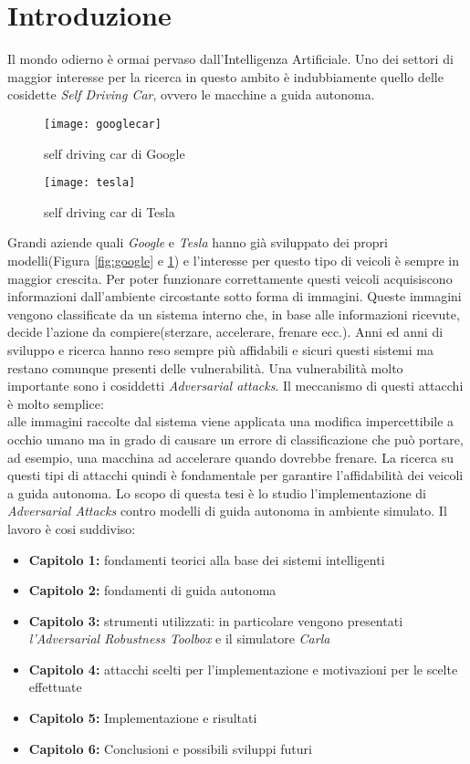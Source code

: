 \chapter*{Introduzione}
Il mondo odierno è ormai pervaso dall'Intelligenza Artificiale. Uno dei settori di maggior interesse per la
ricerca in questo ambito è indubbiamente quello delle cosidette \emph{Self Driving Car}, ovvero
le macchine a guida autonoma. 
\begin{figure}
  \centering
  \parbox{5cm}{
  \texttt{[image: googlecar]}
  \caption{self driving car di Google}
  \label{fig:google}}
  \qquad
  \begin{minipage}{5cm}
  \texttt{[image: tesla]}
  \caption{self driving car di Tesla}
  \label{fig:tesla}
  \end{minipage}
  \end{figure}
Grandi aziende quali \emph{Google} e \emph{Tesla} hanno già sviluppato
dei propri modelli(Figura \ref{fig:google} e \ref{fig:tesla}) e l'interesse per questo tipo di veicoli è sempre in  maggior crescita.
Per poter funzionare correttamente questi veicoli acquisiscono informazioni dall'ambiente circostante sotto forma di immagini.
Queste immagini vengono classificate da un sistema interno che, in base alle informazioni ricevute, decide l'azione da compiere(sterzare, accelerare, frenare ecc.).
Anni ed anni di sviluppo e ricerca hanno reso sempre più affidabili e sicuri  questi sistemi ma restano comunque presenti delle vulnerabilità. Una vulnerabilità
molto importante sono i cosiddetti \emph{Adversarial attacks}. Il meccanismo di questi attacchi è molto semplice:
\\
alle immagini raccolte dal sistema viene applicata una modifica impercettibile a occhio umano ma in grado di causare un errore di classificazione che può portare, ad esempio, una macchina ad accelerare quando
dovrebbe frenare. La ricerca su questi tipi di attacchi quindi è fondamentale per garantire l'affidabilità dei veicoli a guida autonoma.
Lo scopo di questa tesi è lo studio l'implementazione di \emph{Adversarial Attacks} contro modelli di guida autonoma in ambiente simulato.
Il lavoro è cosi suddiviso:
\begin{itemize}
  \item \textbf{Capitolo 1:} fondamenti teorici alla base dei sistemi intelligenti
  \item \textbf{Capitolo 2:} fondamenti di guida autonoma
  \item \textbf{Capitolo 3:} strumenti utilizzati: in particolare vengono presentati \emph{l'Adversarial Robustness Toolbox} e il simulatore \emph{Carla}
  \item \textbf{Capitolo 4:} attacchi scelti per l'implementazione e  motivazioni per le scelte effettuate
  \item \textbf{Capitolo 5:} Implementazione e risultati
  \item \textbf{Capitolo 6:} Conclusioni e possibili sviluppi futuri
  
\end{itemize}


